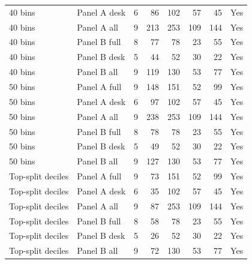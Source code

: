 \begin{tabular}{llrrrrrc}
40 bins & Panel A desk & 6 & 86 & 102 & 57 & 45 & Yes \\
40 bins & Panel A all & 9 & 213 & 253 & 109 & 144 & Yes \\
40 bins & Panel B full & 8 & 77 & 78 & 23 & 55 & Yes \\
40 bins & Panel B desk & 5 & 44 & 52 & 30 & 22 & Yes \\
40 bins & Panel B all & 9 & 119 & 130 & 53 & 77 & Yes \\
50 bins & Panel A full & 9 & 148 & 151 & 52 & 99 & Yes \\
50 bins & Panel A desk & 6 & 97 & 102 & 57 & 45 & Yes \\
50 bins & Panel A all & 9 & 238 & 253 & 109 & 144 & Yes \\
50 bins & Panel B full & 8 & 78 & 78 & 23 & 55 & Yes \\
50 bins & Panel B desk & 5 & 49 & 52 & 30 & 22 & Yes \\
50 bins & Panel B all & 9 & 127 & 130 & 53 & 77 & Yes \\
Top-split deciles & Panel A full & 9 & 73 & 151 & 52 & 99 & Yes \\
Top-split deciles & Panel A desk & 6 & 35 & 102 & 57 & 45 & Yes \\
Top-split deciles & Panel A all & 9 & 87 & 253 & 109 & 144 & Yes \\
Top-split deciles & Panel B full & 8 & 58 & 78 & 23 & 55 & Yes \\
Top-split deciles & Panel B desk & 5 & 26 & 52 & 30 & 22 & Yes \\
Top-split deciles & Panel B all & 9 & 72 & 130 & 53 & 77 & Yes \\
\bottomrule
\end{tabular}
